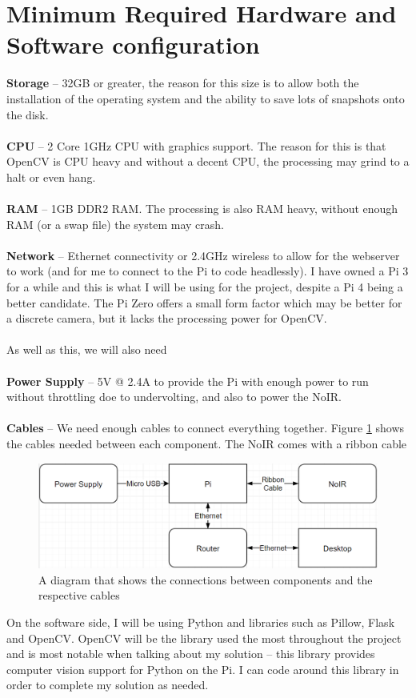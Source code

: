 \documentclass[9pt]{article}
\begin{document}
\section{Minimum Required Hardware and Software configuration}\label{sec_hardware}
\textbf{Storage} -- 32GB or greater, the reason for this size is to allow both the installation of the operating system and the ability to save lots of snapshots onto the disk.\\\\
\textbf{CPU} -- 2 Core 1GHz CPU with graphics support. The reason for this is that OpenCV is CPU heavy and without a decent CPU, the processing may grind to a halt or even hang.\\\\
\textbf{RAM} -- 1GB DDR2 RAM. The processing is also RAM heavy, without enough RAM (or a swap file) the system may crash. \\\\
\textbf{Network} -- Ethernet connectivity or 2.4GHz wireless to allow for the webserver to work (and for me to connect to the Pi to code headlessly).
I have owned a Pi 3 for a while and this is what I will be using for the project, despite a Pi 4 being a better candidate. The Pi Zero offers a small form factor which may be better for a discrete camera, but it lacks the processing power for OpenCV.\\\\
As well as this, we will also need\\\\
\textbf{Power Supply} -- 5V @ 2.4A to provide the Pi with enough power to run without throttling doe to undervolting, and also to power the NoIR.\\\\
\textbf{Cables} -- We need enough cables to connect everything together. Figure \ref{fig_raspberryCables} shows the cables needed between each component. The NoIR comes with a ribbon cable
\begin{figure}[H]
	\centering
	\includegraphics[width=4.5in]{raspberryCables.png}
	\caption{A diagram that shows the connections between components and the respective cables}\label{fig_raspberryCables}
\end{figure}
On the software side, I will be using Python and libraries such as Pillow, Flask and OpenCV. OpenCV will be the library used the most throughout the project and is most notable when talking about my solution -- this library provides computer vision support for Python on the Pi. I can code around this library in order to complete my solution as needed.
\newpage
\end{document}

